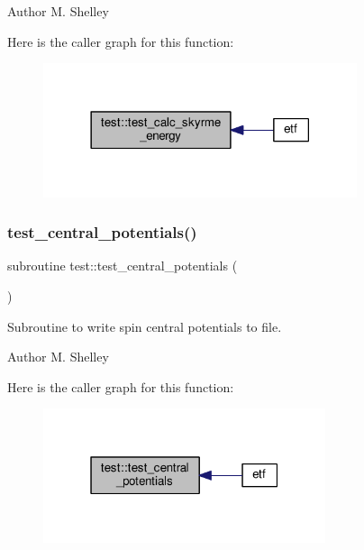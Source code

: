 \begin{DoxyAuthor}{Author}
M. Shelley 
\end{DoxyAuthor}
Here is the caller graph for this function\+:
\nopagebreak
\begin{figure}[H]
\begin{center}
\leavevmode
\includegraphics[width=261pt]{namespacetest_aa2a14f70fb7372abc970b6271f19417f_icgraph}
\end{center}
\end{figure}
\mbox{\label{namespacetest_a5693dbb30b96995df35fa720f0ab1436}} 
\subsubsection{\texorpdfstring{test\+\_\+central\+\_\+potentials()}{test\_central\_potentials()}}
{\footnotesize\ttfamily subroutine test\+::test\+\_\+central\+\_\+potentials (\begin{DoxyParamCaption}{ }\end{DoxyParamCaption})}



Subroutine to write spin central potentials to file. 

\begin{DoxyAuthor}{Author}
M. Shelley 
\end{DoxyAuthor}
Here is the caller graph for this function\+:
\nopagebreak
\begin{figure}[H]
\begin{center}
\leavevmode
\includegraphics[width=235pt]{namespacetest_a5693dbb30b96995df35fa720f0ab1436_icgraph}
\end{center}
\end{figure}
\mbox{\label{namespacetest_ac81b1d59a968470b8ef8a165101df52c}} 
